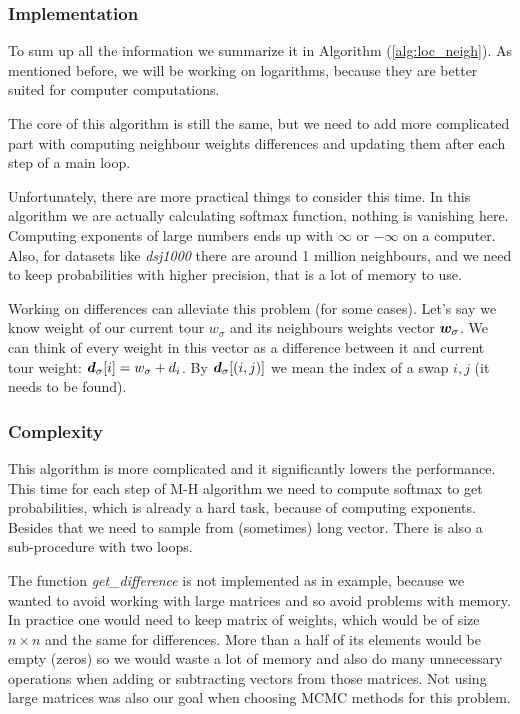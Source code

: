 	\subsubsection{Implementation}
	
		To sum up all the information we summarize it in Algorithm (\ref{alg:loc_neigh}). As mentioned before, we will be working on logarithms, because they are better suited for computer computations.

		The core of this algorithm is still the same, but we need to add more complicated part with computing neighbour weights differences and updating them after each step of a main loop.
		
		Unfortunately, there are more practical things to consider this time. In this algorithm we are actually calculating softmax function, nothing is vanishing here. Computing exponents of large numbers ends up with $\infty$ or $-\infty$ on a computer. Also, for datasets like \textit{dsj1000} there are around 1 million neighbours, and we need to keep probabilities with higher precision, that is a lot of memory to use.
		
		Working on differences can alleviate this problem (for some cases). Let's say we know weight of our current tour $w_\sigma$ and its neighbours weights vector $\bm{w}_\sigma$. We can think of every weight in this vector as a difference between it and current tour weight: $\bm{d}_{\sigma}[i] = w_\sigma + d_i$. By $\bm{d}_\sigma[(i,j)]$ we mean the index of a swap $i,j$ (it needs to be found).
		
		
		
	\subsubsection{Complexity}
		This algorithm is more complicated and it significantly lowers the performance. This time for each step of M-H algorithm we need to compute softmax to get probabilities, which is already a hard task, because of computing exponents. Besides that we need to sample from (sometimes) long vector. There is also a sub-procedure with two loops.
		
		The function \textit{get\_difference} is not implemented as in example, because we wanted to avoid working with large matrices and so avoid problems with memory. In practice one would need to keep matrix of weights, which would be of size $n \times n$ and the same for differences. More than a half of its elements would be empty (zeros) so we would waste a lot of memory and also do many unnecessary operations when adding or subtracting vectors from those matrices. Not using large matrices was also our goal when choosing MCMC methods for this problem.
		
